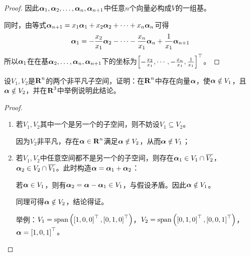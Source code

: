 \begin{proof}
    因此\({\boldsymbol{\alpha}}_1,{\boldsymbol{\alpha}}_2,\dots,{\boldsymbol{\alpha}}_{n},\boldsymbol{\alpha}_{n+1}\)中任意\(n\)个向量必构成\(V\)的一组基。

    同时，由等式\(\boldsymbol{\alpha}_{n+1}=x_1\boldsymbol{\alpha}_1+x_2\boldsymbol{\alpha}_2+\cdots+x_n\boldsymbol{\alpha}_n\)可得
    \begin{equation*}
        \boldsymbol{\alpha}_1=-\frac{x_2}{x_1}\boldsymbol{\alpha}_2-\cdots-\frac{x_n}{x_1}\boldsymbol{\alpha}_n+\frac{1}{x_1}\boldsymbol{\alpha}_{n+1}
    \end{equation*}
    所以\(\boldsymbol{\alpha}_1\)在在基\(\boldsymbol{\alpha}_2,\dots,\boldsymbol{\alpha}_n,\boldsymbol{\alpha}_{n+1}\)下的坐标为\(\left[ -\frac{x_2}{x_1},\cdots,-\frac{x_n}{x_1},\frac{1}{x_1} \right]^\top\)。
\end{proof}

\setcounter{problem}{11}
\begin{problem}
设\(V_1,V_2\)是\(\boldsymbol{\mathrm{R}}^n\)的两个非平凡子空间，证明：在\(\boldsymbol{\mathrm{R}}^n\)中存在向量\(\boldsymbol{\alpha}\)，使\(\boldsymbol{\alpha}\notin V_1\)，且\(\boldsymbol{\alpha}\notin V_2\)，并在\(\boldsymbol{\mathrm{R}}^3\)中举例说明此结论。
\end{problem}
\begin{proof}
    \begin{enumerate}
        \item {
              若\(V_1,V_2\)其中一个是另一个的子空间，则不妨设\(V_1\subseteq V_2\)。

              因为\(V_2\)非平凡，存在\(\boldsymbol{\alpha}\in\boldsymbol{\mathrm{R}}^n\)满足\(\boldsymbol{\alpha}\notin V_2\)，从而\(\boldsymbol{\alpha}\notin V_1\)；
              }
        \item {
              若\(V_1,V_2\)中任意空间都不是另一个的子空间，则存在\(\boldsymbol{\alpha}_1\in V_1\cap\overline{V_2}\)，\(\boldsymbol{\alpha}_2\in V_2\cap\overline{V_1}\)。此时构造\(\boldsymbol{\alpha}=\boldsymbol{\alpha}_1+\boldsymbol{\alpha}_2\)：

              若\(\boldsymbol{\alpha}\in V_1\)，则有\(\boldsymbol{\alpha}_2=\boldsymbol{\alpha}-\boldsymbol{\alpha}_1\in V_1\)，与假设矛盾。因此\(\boldsymbol{\alpha}\notin V_1\)。

              同理可得\(\boldsymbol{\alpha}\notin V_2\)，结论得证。

              举例：\(V_1=\mathrm{span}\left( \left[ 1,0,0 \right]^\top,\left[ 0,1,0 \right]^\top \right)\)，\(V_2=\mathrm{span}\left( \left[ 0,1,0 \right]^\top,\left[ 0,0,1 \right]^\top \right)\)，\(\boldsymbol{\alpha}=\left[ 1,0,1 \right]^\top\)。
              }
    \end{enumerate}
\end{proof}

